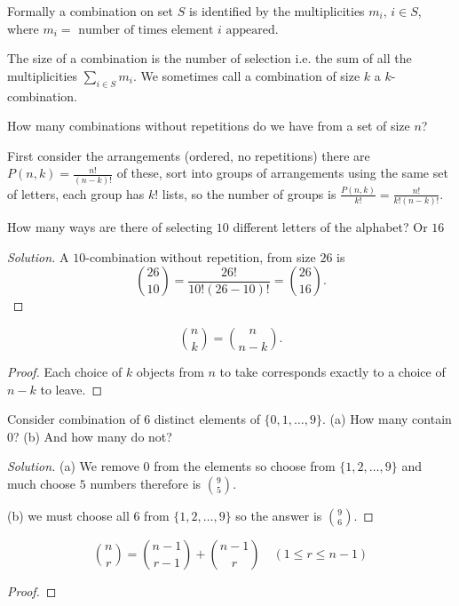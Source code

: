 \documentclass[10pt, a4paper]{article}
\begin{document}
Formally a combination on set $S$ is identified by the multiplicities $m_i,\, i \in S$, where $m_i = \text{ number of times element $i$ appeared}$.

The size of a combination is the number of selection i.e. the sum of all the multiplicities $\sum_{i \in S}m_i$. We sometimes call a combination of size $k$ a $k$-combination.

How many combinations without repetitions do we have from a set of size $n$?

First consider the arrangements (ordered, no repetitions) there are $P(n, k) = \frac{n!}{(n - k)!}$ of these, sort into groups of arrangements using the same set of letters, each group has $k!$ lists, so the number of groups is $\frac{P(n, k)}{k!} = \frac{n!}{k!(n - k)!}$.

\begin{example}
    How many ways are there of selecting $10$ different letters of the alphabet? Or $16$
    \begin{proof}[Solution]\renewcommand{\qedsymbol}{}
        A $10$-combination without repetition, from size $26$ is
        \[
        \binom{26}{10} = \frac{26!}{10!(26 - 10)!} = \binom{26}{16}.
        \]
    \end{proof}
\end{example}

\begin{proposition}
    \[
    \binom{n}{k} = \binom{n}{n - k}.
    \]
    \begin{proof}
        Each choice of $k$ objects from $n$ to take corresponds exactly to a choice of $n - k$ to leave.
    \end{proof}
\end{proposition}

\begin{example}
    Consider combination of $6$ distinct elements of $\{0, 1, \dotsc, 9\}$. (a) How many contain $0$? (b) And how many do not?
    \begin{proof}[Solution]\renewcommand{\qedsymbol}{}
        (a) We remove $0$ from the elements so choose from $\{1, 2, \dotsc, 9\}$ and much choose $5$ numbers therefore is $\binom{9}{5}$.

        (b) we must choose all $6$ from $\{1, 2, \dotsc, 9\}$ so the answer is $\binom{9}{6}$.
    \end{proof}
\end{example}

\begin{proposition}
    \[
    \binom{n}{r} = \binom{n - 1}{r - 1} + \binom{n - 1}{r}\quad(1 \leq r \leq n - 1)
    \]
    \begin{proof}
        
    \end{proof}
\end{proposition}
\end{document}
